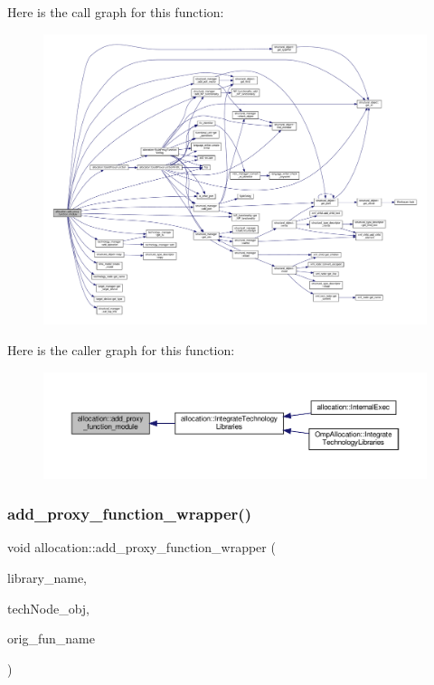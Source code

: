 Here is the call graph for this function\+:
\nopagebreak
\begin{figure}[H]
\begin{center}
\leavevmode
\includegraphics[width=350pt]{d0/d74/classallocation_a4084c75f1c138f51b8b7f3c609d45d01_cgraph}
\end{center}
\end{figure}
Here is the caller graph for this function\+:
\nopagebreak
\begin{figure}[H]
\begin{center}
\leavevmode
\includegraphics[width=350pt]{d0/d74/classallocation_a4084c75f1c138f51b8b7f3c609d45d01_icgraph}
\end{center}
\end{figure}
\mbox{\label{classallocation_afa7e3452b30f32920f34aaad4d3299ed}} 
\subsubsection{\texorpdfstring{add\+\_\+proxy\+\_\+function\+\_\+wrapper()}{add\_proxy\_function\_wrapper()}}
{\footnotesize\ttfamily void allocation\+::add\+\_\+proxy\+\_\+function\+\_\+wrapper (\begin{DoxyParamCaption}\item[{const std\+::string \&}]{library\+\_\+name,  }\item[{\hyperlink{technology__node_8hpp_a33dd193b7bd6b987bf0d8a770a819fa7}{technology\+\_\+node\+Ref}}]{tech\+Node\+\_\+obj,  }\item[{const std\+::string \&}]{orig\+\_\+fun\+\_\+name }\end{DoxyParamCaption})\hspace{0.3cm}{\ttfamily [protected]}}



